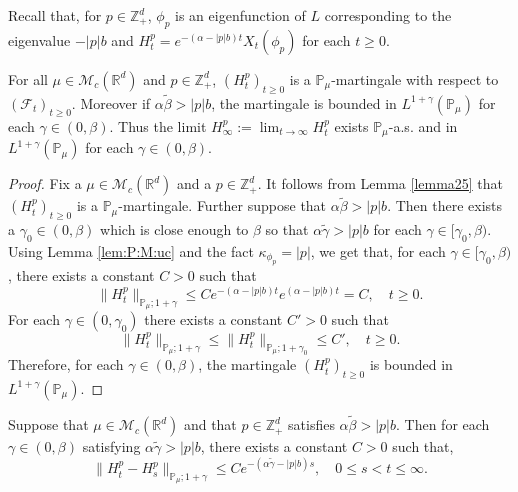 \documentclass[EJP]{ejpecp} %
\begin{document}
	Recall that, for $p\in \mathbb Z_+^d$,  $\phi_p$ is an eigenfunction of $L$ corresponding to the eigenvalue $-|p|b$ and $ H_t^p =e^{-(\alpha-|p|b)t}X_t(\phi_p)$ for each $t\geq 0$.

\begin{lemma}
\label{lem:M:L:ML}
   	For all $\mu\in \mathcal M_c(\mathbb R^d)$ and $p \in \mathbb Z_+^d$, $(H^p_t)_{t\geq 0}$ is a $\mathbb P_{\mu}$-martingale with respect to $(\mathscr F_t)_{t\geq 0}$.
    Moreover if $\alpha\tilde \beta>|p|b$, the martingale is bounded in $L^{1+\gamma}(\mathbb P_\mu)$ for each $\gamma\in (0, \beta)$.
  	Thus the limit $ H_{\infty}^p := \lim_{t\rightarrow \infty}H_t^p $  exists $\mathbb{P}_{\mu}$-a.s. and in $L^{1+\gamma}(\mathbb{P}_{\mu})$ for each $\gamma \in (0,\beta)$.
\end{lemma}

\begin{proof}
  	Fix a $\mu \in \mathcal M_c(\mathbb R^d)$ and a $p \in \mathbb Z_+^d$.
  	It follows from Lemma \ref{lemma25} that $(H_t^p)_{t\geq 0}$ is a $\mathbb P_\mu$-martingale.
  	Further suppose that $\alpha \tilde \beta > |p| b$.
  	Then there exists a $\gamma_0 \in (0,\beta)$ which is close enough to $\beta$ so that $\alpha\tilde \gamma>|p|b$ for each $\gamma\in [\gamma_0, \beta)$.
  	Using  Lemma \ref{lem:P:M:uc} and the fact $\kappa_{\phi_p}=|p|$, we get that, for each $\gamma\in [\gamma_0, \beta)$, there exists a constant $C>0$ such that
\[
    \|H_t^p\|_{\mathbb P_\mu;1+\gamma}
    \leq C e^{-(\alpha-|p|b)t}e^{(\alpha-|p|b)t}
    = C, 
    \quad t\geq 0.
\]
	For each $\gamma\in (0, \gamma_0)$ there exists a constant $C'>0$ such that
\[
    \| H_t^p \|_{\mathbb P_\mu;1+\gamma}
    \leq \| H_t^p \|_{\mathbb P_\mu;1+\gamma_0}
    \leq C',
    \quad t\geq 0.
\]
	Therefore, for each $\gamma \in (0,\beta)$, the martingale $(H_t^p)_{t\geq 0}$ is bounded in $L^{1+\gamma}(\mathbb{P}_{\mu})$.
\end{proof}

\begin{lemma}
\label{lem: control of wt}
	Suppose that $\mu\in \mathcal M_c(\mathbb R^d)$ and that $p \in \mathbb Z_+^d$ satisfies $\alpha \tilde \beta > |p|b$.
	Then for each $\gamma \in (0,\beta)$ satisfying $\alpha \tilde \gamma > |p|b$, there exists a constant $C> 0$ such that,
\[
    \|H^p_t-H^p_s\|_{\mathbb{P}_{\mu};1+\gamma}
    \leq C e^{-(\alpha \tilde \gamma-|p|b)s},
    \quad 0 \leq s < t \leq \infty.
\]
\end{lemma}
\end{document}
